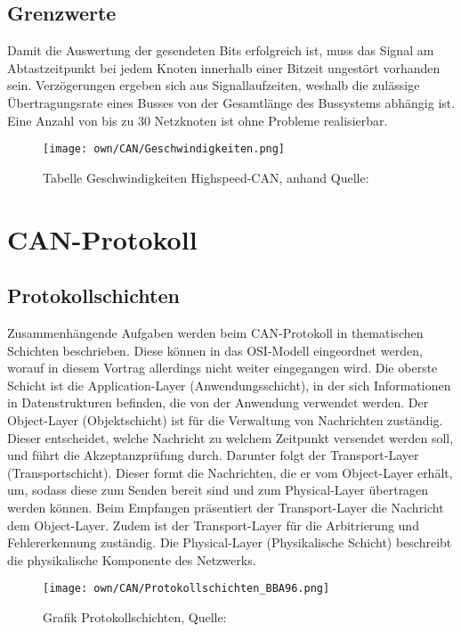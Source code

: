     \subsection{Grenzwerte}
    Damit die Auswertung der gesendeten Bits erfolgreich ist, muss das Signal am Abtastzeitpunkt bei jedem Knoten innerhalb einer Bitzeit ungestört vorhanden sein.
    Verzögerungen ergeben sich aus Signallaufzeiten, weshalb die zulässige Übertragungsrate eines Busses von der Gesamtlänge des Bussystems abhängig ist.
    Eine Anzahl von bis zu 30 Netzknoten ist ohne Probleme realisierbar.
    \begin{figure}[!htbp]
        \centering
        \texttt{[image: own/CAN/Geschwindigkeiten.png]}
        \caption{Tabelle Geschwindigkeiten Highspeed-CAN, anhand Quelle: \cite{BAA2011, S.95}}
        \label{fig:Geschwindigkeiten}
    \end{figure}

\section{CAN-Protokoll}
    \subsection{Protokollschichten}
    Zusammenhängende Aufgaben werden beim CAN-Protokoll in thematischen Schichten beschrieben.
    Diese können in das OSI-Modell eingeordnet werden, worauf in diesem Vortrag allerdings nicht weiter eingegangen wird.
    Die oberste Schicht ist die Application-Layer (Anwendungsschicht), in der sich Informationen in Datenstrukturen befinden, die von der Anwendung verwendet werden. 
    Der Object-Layer (Objektschicht) ist für die Verwaltung von Nachrichten zuständig.
    Dieser entscheidet, welche Nachricht zu welchem Zeitpunkt versendet werden soll, und führt die Akzeptanzprüfung durch.
    Darunter folgt der Transport-Layer (Transportschicht).
    Dieser formt die Nachrichten, die er vom Object-Layer erhält, um, sodass diese zum Senden bereit sind und zum Physical-Layer übertragen werden können.
    Beim Empfangen präsentiert der Transport-Layer die Nachricht dem Object-Layer.
    Zudem ist der Transport-Layer für die Arbitrierung und Fehlererkennung zuständig.
    Die Physical-Layer (Physikalische Schicht) beschreibt die physikalische Komponente des Netzwerks. 
    \begin{figure}[!htbp]
        \centering
        \texttt{[image: own/CAN/Protokollschichten\_BBA96.png]}
        \caption{Grafik Protokollschichten, Quelle: \cite{BAA2011, S.96}}
        \label{fig:Protokollschichten}
    \end{figure}

